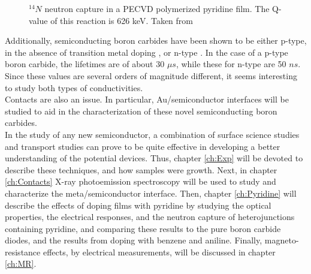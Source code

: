 \begin{figure}[h!]
\centering
\caption{$^{14}N$ neutron capture in a PECVD polymerized pyridine film. The Q-value of this reaction is 626 keV. Taken from \cite{Tan}}\label{N}	
\end{figure}

\noindent Additionally, semiconducting boron carbides have been shown to be either p-type, in the absence of transition metal doping \cite{intro_2_Hwang,intro_2_Hwang2, intro_2_Hwang3, intro_2_Carlson}, or n-type \cite{intro_2_Peterson, intro_2_Robertson, intro_2_caruso}. In the case of a p-type boron carbide, the lifetimes are of about 30 $\mu s$, while these for n-type are 50 $ns$. Since these values are several orders of magnitude different, it seems interesting to study both types of conductivities. \\

\noindent Contacts are also an issue. In particular, Au/semiconductor interfaces will be studied to aid in the characterization of these novel semiconducting boron carbides.  \\



\noindent In the study of any new semiconductor, a combination of surface science studies and transport studies can prove to be quite effective in developing a better understanding of the potential devices. Thus, chapter \ref{ch:Exp} will be devoted to describe these techniques, and how samples were growth. Next, in chapter \ref{ch:Contacts} X-ray photoemission spectroscopy will be used to study and characterize the meta/semiconductor interface. Then, chapter \ref{ch:Pyridine} will describe the effects of doping films with pyridine by studying the optical properties, the electrical responses, and the neutron capture of heterojunctions containing pyridine, and comparing these results to the pure boron carbide diodes, and the results from doping with benzene and aniline. Finally, magneto-resistance effects, by electrical measurements, will be discussed in chapter \ref{ch:MR}. 


